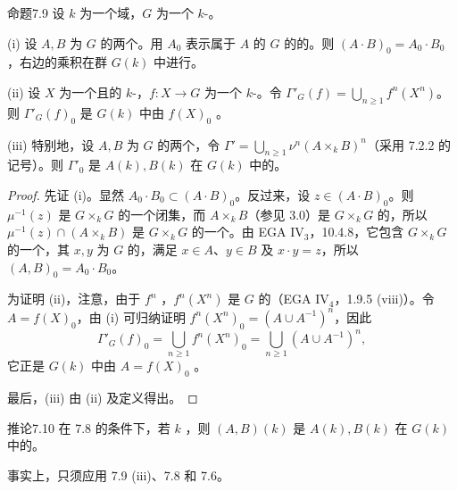 \begin{SGAresult}{命题}{7.9}
设 $k$ 为一个域，$G$ 为一个 $k$-。

(i) 设 $A,B$ 为 $G$ 的两个。用 $A_0$ 表示属于 $A$ 的 $G$ 的的。则 $(A\cdot B)_0=A_0\cdot B_0$，右边的乘积在群 $G(k)$ 中进行。

(ii) 设 $X$ 为一个且的 $k$-，$f:X\to G$ 为一个 $k$-。令 $\Gamma'_G(f)=\bigcup_{n\geq1}f^n(X^n)$。则 $\Gamma'_G(f)_0$ 是 $G(k)$ 中由 $f(X)_0$ 。

(iii) 特别地，设 $A,B$ 为 $G$ 的两个，令 $\Gamma'=\bigcup_{n\geq1}\nu^n(A\times_k B)^n$（采用 7.2.2 的记号）。则 $\Gamma'_0$ 是 $A(k),B(k)$ 在 $G(k)$ 中的。
\end{SGAresult}
\begin{proof}
先证 (i)。显然 $A_0\cdot B_0\subset(A\cdot B)_0$。反过来，设 $z\in(A\cdot B)_0$。则 $\mu^{-1}(z)$ 是 $G\times_k G$ 的一个闭集，而 $A\times_k B$（参见 3.0）是 $G\times_k G$ 的，所以 $\mu^{-1}(z)\cap(A\times_k B)$ 是 $G\times_k G$ 的一个。由 EGA $\mathrm{IV}_3$，10.4.8，它包含 $G\times_k G$ 的一个，其 $x,y$ 为 $G$ 的，满足 $x\in A$、$y\in B$ 及 $x\cdot y=z$，所以 $(A,B)_0=A_0\cdot B_0$。

为证明 (ii)，注意，由于 $f^n$ ，$f^n(X^n)$ 是 $G$ 的（EGA $\mathrm{IV}_4$，1.9.5 (viii)）。令 $A=f(X)_0$，由 (i) 可归纳证明 $f^n(X^n)_0=(A\cup A^{-1})^n$，因此
\[
\Gamma'_G(f)_0=\bigcup_{n\geq1}f^n(X^n)_0
=\bigcup_{n\geq1}(A\cup A^{-1})^n,
\]
它正是 $G(k)$ 中由 $A=f(X)_0$ 。

最后，(iii) 由 (ii) 及定义得出。
\end{proof}

\begin{SGAresult}{推论}{7.10}
在 7.8 的条件下，若 $k$ ，则 $(A,B)(k)$ 是 $A(k),B(k)$ 在 $G(k)$ 中的。
\end{SGAresult}
事实上，只须应用 7.9 (iii)、7.8 和 7.6。

